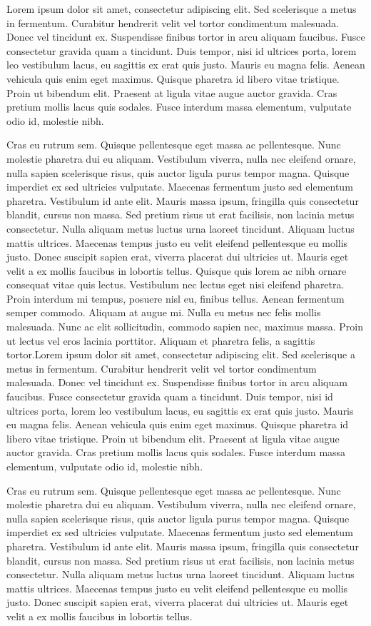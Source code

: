 \documentclass[10pt,twoside,slovak,a4paper]{article}
\begin{document}
Lorem ipsum dolor sit amet, consectetur adipiscing elit. Sed scelerisque a metus in fermentum. Curabitur hendrerit velit vel tortor condimentum malesuada. Donec vel tincidunt ex. Suspendisse finibus tortor in arcu aliquam faucibus. Fusce consectetur gravida quam a tincidunt. Duis tempor, nisi id ultrices porta, lorem leo vestibulum lacus, eu sagittis ex erat quis justo. Mauris eu magna felis. Aenean vehicula quis enim eget maximus. Quisque pharetra id libero vitae tristique. Proin ut bibendum elit. Praesent at ligula vitae augue auctor gravida. Cras pretium mollis lacus quis sodales. Fusce interdum massa elementum, vulputate odio id, molestie nibh.

Cras eu rutrum sem. Quisque pellentesque eget massa ac pellentesque. Nunc molestie pharetra dui eu aliquam. Vestibulum viverra, nulla nec eleifend ornare, nulla sapien scelerisque risus, quis auctor ligula purus tempor magna. Quisque imperdiet ex sed ultricies vulputate. Maecenas fermentum justo sed elementum pharetra. Vestibulum id ante elit. Mauris massa ipsum, fringilla quis consectetur blandit, cursus non massa. Sed pretium risus ut erat facilisis, non lacinia metus consectetur. Nulla aliquam metus luctus urna laoreet tincidunt. Aliquam luctus mattis ultrices. Maecenas tempus justo eu velit eleifend pellentesque eu mollis justo. Donec suscipit sapien erat, viverra placerat dui ultricies ut. Mauris eget velit a ex mollis faucibus in lobortis tellus.
Quisque quis lorem ac nibh ornare consequat vitae quis lectus. Vestibulum nec lectus eget nisi eleifend pharetra. Proin interdum mi tempus, posuere nisl eu, finibus tellus. Aenean fermentum semper commodo. Aliquam at augue mi. Nulla eu metus nec felis mollis malesuada. Nunc ac elit sollicitudin, commodo sapien nec, maximus massa. Proin ut lectus vel eros lacinia porttitor. Aliquam et pharetra felis, a sagittis tortor.Lorem ipsum dolor sit amet, consectetur adipiscing elit. Sed scelerisque a metus in fermentum. Curabitur hendrerit velit vel tortor condimentum malesuada. Donec vel tincidunt ex. Suspendisse finibus tortor in arcu aliquam faucibus. Fusce consectetur gravida quam a tincidunt. Duis tempor, nisi id ultrices porta, lorem leo vestibulum lacus, eu sagittis ex erat quis justo. Mauris eu magna felis. Aenean vehicula quis enim eget maximus. Quisque pharetra id libero vitae tristique. Proin ut bibendum elit. Praesent at ligula vitae augue auctor gravida. Cras pretium mollis lacus quis sodales. Fusce interdum massa elementum, vulputate odio id, molestie nibh.

Cras eu rutrum sem. Quisque pellentesque eget massa ac pellentesque. Nunc molestie pharetra dui eu aliquam. Vestibulum viverra, nulla nec eleifend ornare, nulla sapien scelerisque risus, quis auctor ligula purus tempor magna. Quisque imperdiet ex sed ultricies vulputate. Maecenas fermentum justo sed elementum pharetra. Vestibulum id ante elit. Mauris massa ipsum, fringilla quis consectetur blandit, cursus non massa. Sed pretium risus ut erat facilisis, non lacinia metus consectetur. Nulla aliquam metus luctus urna laoreet tincidunt. Aliquam luctus mattis ultrices. Maecenas tempus justo eu velit eleifend pellentesque eu mollis justo. Donec suscipit sapien erat, viverra placerat dui ultricies ut. Mauris eget velit a ex mollis faucibus in lobortis tellus.
\end{document}

